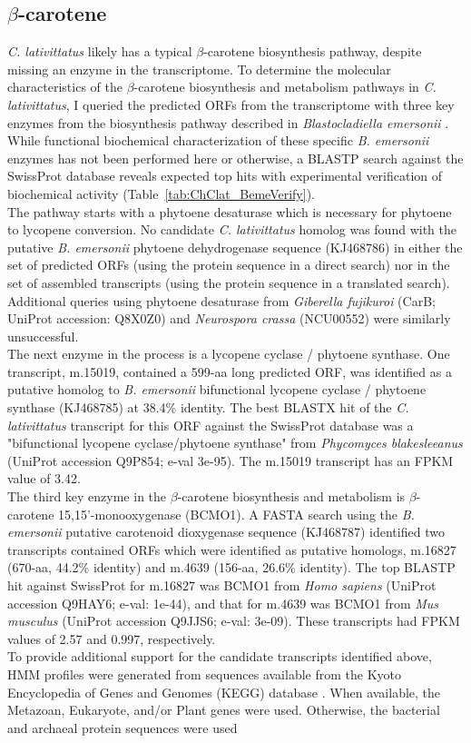 \subsection*{$\beta$-carotene} 
\textit{C. lativittatus} likely has a typical $\beta$-carotene biosynthesis pathway, despite missing an enzyme in the transcriptome. To determine the molecular characteristics of the $\beta$-carotene biosynthesis and metabolism pathways in \textit{C. lativittatus}, I queried the predicted ORFs from the transcriptome with three key enzymes from the biosynthesis pathway described in \textit{Blastocladiella emersonii} \cite{Avelar2014}. While functional biochemical characterization of these specific \textit{B. emersonii} enzymes has not been performed here or otherwise, a BLASTP search against the SwissProt database reveals expected top hits with experimental verification of biochemical activity (Table~\ref{tab:ChClat_BemeVerify}). \\
\indent The pathway starts with a phytoene desaturase which is necessary for phytoene to lycopene conversion. No candidate \textit{C. lativittatus} homolog was found with the putative \textit{B. emersonii} phytoene dehydrogenase sequence (KJ468786) in either the set of predicted ORFs (using the protein sequence in a direct search) nor in the set of assembled transcripts (using the protein sequence in a translated search). Additional queries using phytoene desaturase from \textit{Giberella fujikuroi} (CarB; UniProt accession: Q8X0Z0) and \textit{Neurospora crassa} (NCU00552) were similarly unsuccessful. \\
\indent The next enzyme in the process is a lycopene cyclase / phytoene synthase. One transcript, m.15019, contained a 599-aa long predicted ORF, was identified as a putative homolog to \textit{B. emersonii} bifunctional lycopene cyclase / phytoene synthase (KJ468785) at 38.4\% identity. The best BLASTX hit of the \textit{C. lativittatus} transcript for this ORF against the SwissProt database was a "bifunctional lycopene cyclase/phytoene synthase" from\textit{ Phycomyces blakesleeanus} (UniProt accession Q9P854; e-val 3e-95). The m.15019 transcript has an FPKM value of 3.42. \\
\indent The third key enzyme in the $\beta$-carotene biosynthesis and metabolism is $\beta$-carotene 15,15'-monooxygenase (BCMO1). A FASTA search using the \textit{B. emersonii} putative carotenoid dioxygenase sequence (KJ468787) identified two transcripts contained ORFs which were identified as putative homologs, m.16827 (670-aa, 44.2\% identity) and m.4639 (156-aa, 26.6\% identity). The top BLASTP hit against SwissProt for m.16827 was BCMO1 from \textit{Homo sapiens} (UniProt accession Q9HAY6; e-val: 1e-44), and that for m.4639 was BCMO1 from \textit{Mus musculus} (UniProt accession Q9JJS6; e-val: 3e-09). These transcripts had FPKM values of 2.57 and 0.997, respectively. \\
\indent To provide additional support for the candidate transcripts identified above, HMM profiles were generated from sequences available from the Kyoto Encyclopedia of Genes and Genomes (KEGG) database \cite{Kanehisa2000,Kanehisa2014}. When available, the Metazoan, Eukaryote, and/or Plant genes were used. Otherwise, the bacterial and archaeal protein sequences were used 

